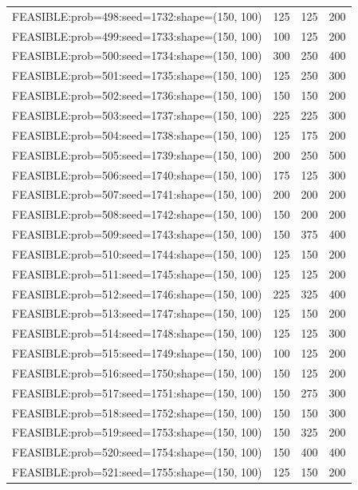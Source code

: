 \begin{longtable}{lccc}
FEASIBLE:prob=498:seed=1732:shape=(150, 100) &  125 &   125 &    200 \\
FEASIBLE:prob=499:seed=1733:shape=(150, 100) &  100 &   125 &    200 \\
FEASIBLE:prob=500:seed=1734:shape=(150, 100) &  300 &   250 &    400 \\
FEASIBLE:prob=501:seed=1735:shape=(150, 100) &  125 &   250 &    300 \\
FEASIBLE:prob=502:seed=1736:shape=(150, 100) &  150 &   150 &    200 \\
FEASIBLE:prob=503:seed=1737:shape=(150, 100) &  225 &   225 &    300 \\
FEASIBLE:prob=504:seed=1738:shape=(150, 100) &  125 &   175 &    200 \\
FEASIBLE:prob=505:seed=1739:shape=(150, 100) &  200 &   250 &    500 \\
FEASIBLE:prob=506:seed=1740:shape=(150, 100) &  175 &   125 &    300 \\
FEASIBLE:prob=507:seed=1741:shape=(150, 100) &  200 &   200 &    200 \\
FEASIBLE:prob=508:seed=1742:shape=(150, 100) &  150 &   200 &    200 \\
FEASIBLE:prob=509:seed=1743:shape=(150, 100) &  150 &   375 &    400 \\
FEASIBLE:prob=510:seed=1744:shape=(150, 100) &  125 &   150 &    200 \\
FEASIBLE:prob=511:seed=1745:shape=(150, 100) &  125 &   125 &    200 \\
FEASIBLE:prob=512:seed=1746:shape=(150, 100) &  225 &   325 &    400 \\
FEASIBLE:prob=513:seed=1747:shape=(150, 100) &  125 &   150 &    200 \\
FEASIBLE:prob=514:seed=1748:shape=(150, 100) &  125 &   125 &    300 \\
FEASIBLE:prob=515:seed=1749:shape=(150, 100) &  100 &   125 &    200 \\
FEASIBLE:prob=516:seed=1750:shape=(150, 100) &  150 &   125 &    200 \\
FEASIBLE:prob=517:seed=1751:shape=(150, 100) &  150 &   275 &    300 \\
FEASIBLE:prob=518:seed=1752:shape=(150, 100) &  150 &   150 &    300 \\
FEASIBLE:prob=519:seed=1753:shape=(150, 100) &  150 &   325 &    200 \\
FEASIBLE:prob=520:seed=1754:shape=(150, 100) &  150 &   400 &    400 \\
FEASIBLE:prob=521:seed=1755:shape=(150, 100) &  125 &   150 &    200 \\

\end{longtable}
